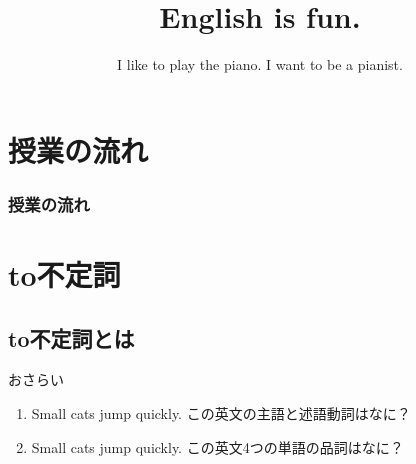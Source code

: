 \documentclass[aspectratio=169,xcolor={dvipsnames,table}]{beamer}
\title{English is fun.}
\subtitle{I like to play the piano. I want to be a pianist.}
\author{}
\institute[]{}
\date[]
\begin{document}
\begin{frame}[plain]
  \titlepage
\end{frame}


\section*{授業の流れ}
\begin{frame}[plain]
  \frametitle{授業の流れ}
  \tableofcontents
\end{frame}

\section{to不定詞}
\subsection{to不定詞とは}
\begin{frame}[plain]{おさらい}
\Large

\begin{enumerate}
 \item<1-> Small cats jump quickly.%
      \hfill{\small この英文の主語と述語動詞はなに？}
 \item<3-> Small cats jump quickly.%
      \hfill{\small この英文4つの単語の品詞はなに？}\\
	\visible<4->{{\small \Circled{ 形 }\hspace{25pt}\Circled{ 名 }\hspace{15pt}\Circled{ 動 }\hspace{24pt}\Circled{ 副 }}}
\end{enumerate}
\end{frame}
\end{document}

